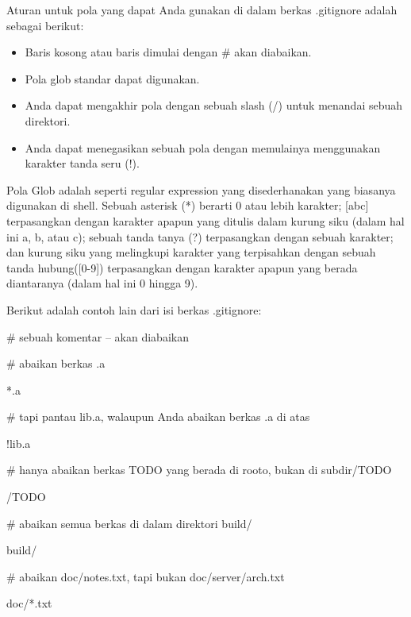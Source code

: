 \noindent 
Aturan untuk pola yang dapat Anda gunakan di dalam berkas .gitignore adalah sebagai berikut: \par
\noindent 
\begin{itemize}
\item Baris kosong atau baris dimulai dengan  $  \#  $ akan diabaikan. \par
\noindent 
\item Pola glob standar dapat digunakan. \par
\noindent 
\item Anda dapat mengakhir pola dengan sebuah slash (/) untuk menandai sebuah direktori. \par
\noindent 
\item Anda dapat menegasikan sebuah pola dengan memulainya menggunakan karakter tanda seru (!).\end{itemize}
 \par
\noindent 
Pola Glob adalah seperti regular expression yang disederhanakan yang biasanya digunakan di shell. Sebuah asterisk (*) berarti 0 atau lebih karakter; [abc] terpasangkan dengan karakter apapun yang ditulis dalam kurung siku (dalam hal ini a, b, atau c); sebuah tanda tanya (?) terpasangkan dengan sebuah karakter; dan kurung siku yang melingkupi karakter yang terpisahkan dengan sebuah tanda hubung([0-9]) terpasangkan dengan karakter apapun yang berada diantaranya (dalam hal ini 0 hingga 9). \par
\noindent 
Berikut adalah contoh lain dari isi berkas .gitignore: \par
\noindent 
 $  \#  $ sebuah komentar – akan diabaikan \par
\noindent 
 $  \#  $ abaikan berkas .a \par
\noindent 
*.a \par
\noindent 
 $  \#  $ tapi pantau lib.a, walaupun Anda abaikan berkas .a di atas \par
\noindent 
!lib.a \par
\noindent 
 $  \#  $ hanya abaikan berkas TODO yang berada di rooto, bukan di subdir/TODO \par
\noindent 
/TODO \par
\noindent 
 $  \#  $ abaikan semua berkas di dalam direktori build/ \par
\noindent 
build/ \par
\noindent 
 $  \#  $ abaikan doc/notes.txt, tapi bukan doc/server/arch.txt \par
\noindent 
doc/*.txt \par
\noindent 
